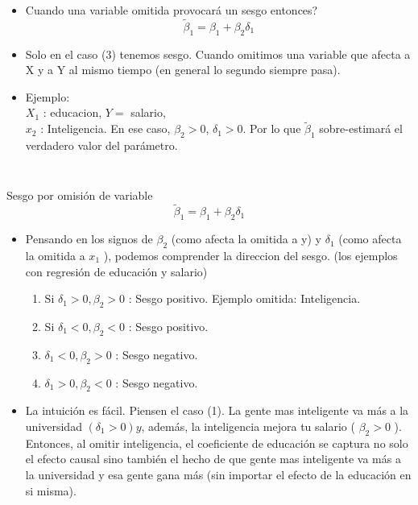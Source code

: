 \documentclass[10pt,aspectratio=169]{beamer}
\begin{document}
\begin{frame}
\begin{columns}
\begin{itemize}
        \item Cuando una variable omitida provocar\'a un sesgo entonces?
        $$
        \tilde{\beta}_{1}=\beta_{1}+\beta_{2} \delta_{1}
        $$
        \item Solo en el caso (3) tenemos sesgo. Cuando omitimos una variable que afecta a X y a Y al mismo tiempo (en general lo segundo siempre pasa).
        \item Ejemplo:\\
        $X_{1}$ : educacion, $Y=$ salario, \\
        $x_{2}$ : Inteligencia. En ese caso, $\beta_{2}>0$, $\delta_{1}>0$. Por lo que $\tilde{\beta}_{1}$ sobre-estimar\'a el verdadero valor del par\'ametro.
    \end{itemize}
    \end{columns}
\end{frame}

\begin{frame}{Sesgo por omisión de variable}
    $$
    \tilde{\beta}_{1}=\beta_{1}+\beta_{2} \delta_{1}
    $$
    \begin{itemize}
        \item Pensando en los signos de $\beta_{2}$ (como afecta la omitida a y) y $\delta_{1}$ (como afecta la omitida a $x_{1}$ ), podemos comprender la direccion del sesgo. (los ejemplos con regresi\'on de educaci\'on y salario)
        \begin{enumerate}
            \item Si $\delta_{1}>0, \beta_{2}>0$ : Sesgo positivo. Ejemplo omitida: Inteligencia.
            \item Si $\delta_{1}<0, \beta_{2}<0$ : Sesgo positivo.
            \item $\delta_{1}<0, \beta_{2}>0$ : Sesgo negativo.
            \item $\delta_{1}>0, \beta_{2}<0$ : Sesgo negativo.
        \end{enumerate}

        \item La intuici\'on es f\'acil. Piensen el caso (1). La gente mas inteligente va m\'as a la universidad $\left(\delta_{1}>0\right) y$, adem\'as, la inteligencia mejora tu salario ( $\beta_{2}>0$ ). Entonces, al omitir inteligencia, el coeficiente de educaci\'on se captura no solo el efecto causal sino tambi\'en el hecho de que gente mas inteligente va m\'as a la universidad y esa gente gana m\'as (sin importar el efecto de la educaci\'on en si misma).
    \end{itemize}
\end{frame}
\end{document}
